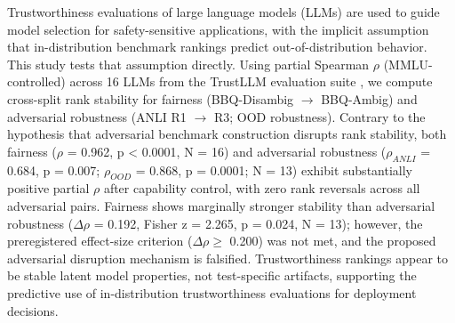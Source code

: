 
Trustworthiness evaluations of large language models (LLMs) are used to guide model selection for safety-sensitive applications, with the implicit assumption that in-distribution benchmark rankings predict out-of-distribution behavior. This study tests that assumption directly. Using partial Spearman $\rho$ (MMLU-controlled) across 16 LLMs from the TrustLLM evaluation suite \citep{Sun2024TrustLLM}, we compute cross-split rank stability for fairness (BBQ-Disambig $\rightarrow$ BBQ-Ambig) and adversarial robustness (ANLI R1 $\rightarrow$ R3; OOD robustness). Contrary to the hypothesis that adversarial benchmark construction disrupts rank stability, both fairness ($\rho$ = 0.962, p < 0.0001, N = 16) and adversarial robustness ($\rho_{ANLI}$ = 0.684, p = 0.007; $\rho_{OOD}$ = 0.868, p = 0.0001; N = 13) exhibit substantially positive partial $\rho$ after capability control, with zero rank reversals across all adversarial pairs. Fairness shows marginally stronger stability than adversarial robustness ($\Delta\rho$ = 0.192, Fisher z = 2.265, p = 0.024, N = 13); however, the preregistered effect-size criterion ($\Delta\rho \geq$ 0.200) was not met, and the proposed adversarial disruption mechanism is falsified. Trustworthiness rankings appear to be stable latent model properties, not test-specific artifacts, supporting the predictive use of in-distribution trustworthiness evaluations for deployment decisions.

